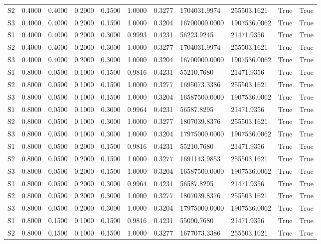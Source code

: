 \documentclass[11pt,a4paper]{article}
\begin{document}
\begin{landscape}
{\begin{longtable}{lllllllllll}
S2 & 0.4000 & 0.4000 & 0.2000 & 0.1500 & 1.0000 & 0.3277 & 1704031.9974 & 255503.1621 & True & True \\
S3 & 0.4000 & 0.4000 & 0.2000 & 0.1500 & 1.0000 & 0.3204 & 16700000.0000 & 1907536.0062 & True & True \\
S1 & 0.4000 & 0.4000 & 0.2000 & 0.3000 & 0.9993 & 0.4231 & 56223.9245 & 21471.9356 & True & True \\
S2 & 0.4000 & 0.4000 & 0.2000 & 0.3000 & 1.0000 & 0.3277 & 1704031.9974 & 255503.1621 & True & True \\
S3 & 0.4000 & 0.4000 & 0.2000 & 0.3000 & 1.0000 & 0.3204 & 16700000.0000 & 1907536.0062 & True & True \\
S1 & 0.8000 & 0.0500 & 0.1000 & 0.1500 & 0.9816 & 0.4231 & 55210.7680 & 21471.9356 & True & True \\
S2 & 0.8000 & 0.0500 & 0.1000 & 0.1500 & 1.0000 & 0.3277 & 1695073.3386 & 255503.1621 & True & True \\
S3 & 0.8000 & 0.0500 & 0.1000 & 0.1500 & 1.0000 & 0.3204 & 16587500.0000 & 1907536.0062 & True & True \\
S1 & 0.8000 & 0.0500 & 0.1000 & 0.3000 & 0.9964 & 0.4231 & 56587.8295 & 21471.9356 & True & True \\
S2 & 0.8000 & 0.0500 & 0.1000 & 0.3000 & 1.0000 & 0.3277 & 1807039.8376 & 255503.1621 & True & True \\
S3 & 0.8000 & 0.0500 & 0.1000 & 0.3000 & 1.0000 & 0.3204 & 17975000.0000 & 1907536.0062 & True & True \\
S1 & 0.8000 & 0.0500 & 0.2000 & 0.1500 & 0.9816 & 0.4231 & 55210.7680 & 21471.9356 & True & True \\
S2 & 0.8000 & 0.0500 & 0.2000 & 0.1500 & 1.0000 & 0.3277 & 1691143.9853 & 255503.1621 & True & True \\
S3 & 0.8000 & 0.0500 & 0.2000 & 0.1500 & 1.0000 & 0.3204 & 16587500.0000 & 1907536.0062 & True & True \\
S1 & 0.8000 & 0.0500 & 0.2000 & 0.3000 & 0.9964 & 0.4231 & 56587.8295 & 21471.9356 & True & True \\
S2 & 0.8000 & 0.0500 & 0.2000 & 0.3000 & 1.0000 & 0.3277 & 1807039.8376 & 255503.1621 & True & True \\
S3 & 0.8000 & 0.0500 & 0.2000 & 0.3000 & 1.0000 & 0.3204 & 17975000.0000 & 1907536.0062 & True & True \\
S1 & 0.8000 & 0.1500 & 0.1000 & 0.1500 & 0.9816 & 0.4231 & 55090.7680 & 21471.9356 & True & True \\
S2 & 0.8000 & 0.1500 & 0.1000 & 0.1500 & 1.0000 & 0.3277 & 1677073.3386 & 255503.1621 & True & True \\

\end{longtable}}
\end{landscape}
\end{document}
